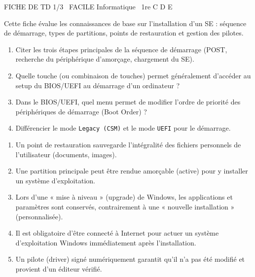 \documentclass[11pt]{article}
\begin{document}
\begin{tcolorbox}[enhanced,colback=popink,colframe=popink,arc=10pt,boxrule=0pt,left=12pt,right=12pt,top=9pt,bottom=9pt]
{\color{white}\popxbold\small FICHE DE TD 1/3 \textbullet\ FACILE \hfill Informatique \textbullet\ 1re C D E\par}
\end{tcolorbox}
\vspace{4pt}
Cette fiche évalue les connaissances de base sur l'installation d'un SE : séquence de démarrage, types de partitions, points de restauration et gestion des pilotes.

\begin{exercice}
\begin{enumerate}
    \item Citer les trois étapes principales de la séquence de démarrage (POST, recherche du périphérique d'amorçage, chargement du SE).
    \item Quelle touche (ou combinaison de touches) permet généralement d'accéder au setup du BIOS/UEFI au démarrage d'un ordinateur ?
    \item Dans le BIOS/UEFI, quel menu permet de modifier l'ordre de priorité des périphériques de démarrage (Boot Order) ?
    \item Différencier le mode \texttt{Legacy (CSM)} et le mode \texttt{UEFI} pour le démarrage.
\end{enumerate}
\end{exercice}

\begin{exercice}
\begin{enumerate}
    \item Un point de restauration sauvegarde l'intégralité des fichiers personnels de l'utilisateur (documents, images).
    \item Une partition principale peut être rendue amorçable (active) pour y installer un système d'exploitation.
    \item Lors d'une « mise à niveau » (upgrade) de Windows, les applications et paramètres sont conservés, contrairement à une « nouvelle installation » (personnalisée).
    \item Il est obligatoire d'être connecté à Internet pour actuer un système d'exploitation Windows immédiatement après l'installation.
    \item Un pilote (driver) signé numériquement garantit qu'il n'a pas été modifié et provient d'un éditeur vérifié.
\end{enumerate}
\end{exercice}
\end{document}
